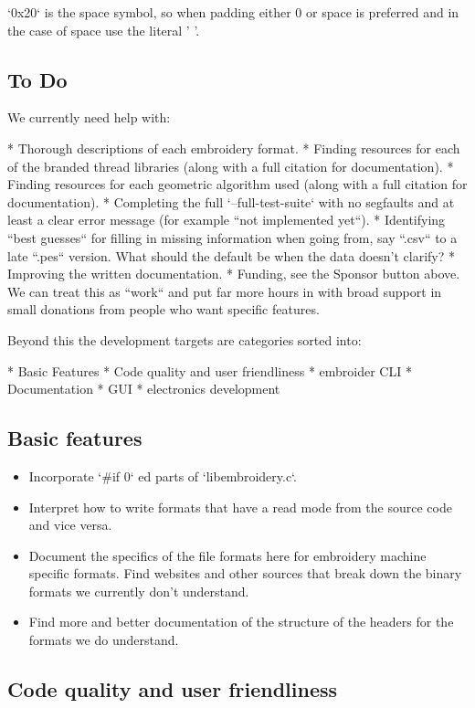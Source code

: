 \documentclass[a4paper]{report}
\begin{document}
`0x20` is the space symbol, so when padding either 0 or space is preferred and
in the case of space use the literal ' '.

\subsection{To Do}

We currently need help with:

* Thorough descriptions of each embroidery format.
* Finding resources for each of the branded thread libraries (along with a
  full citation for documentation).
* Finding resources for each geometric algorithm used (along with a full
  citation for documentation).
* Completing the full `--full-test-suite` with no segfaults and at least a
  clear error message (for example ``not implemented yet``).
* Identifying ``best guesses`` for filling in missing information when going
  from, say ``.csv`` to a late ``.pes`` version. What should the default be when
  the data doesn't clarify?
* Improving the written documentation.
* Funding, see the Sponsor button above. We can treat this as ``work`` and
  put far more hours in with broad support in small donations from people who want
  specific features.

Beyond this the development targets are categories sorted into:

* Basic Features
* Code quality and user friendliness
* embroider CLI
* Documentation
* GUI
* electronics development

\subsection{Basic features}

\begin{itemize}
\item Incorporate `\#if 0` ed parts of `libembroidery.c`.
\item Interpret how to write formats that have a read mode from the source
code and vice versa.
\item Document the specifics of the file formats here for embroidery machine
specific formats. Find websites and other sources that break down the binary
formats we currently don't understand.
\item Find more and better documentation of the structure of the headers for the
formats we do understand.
\end{itemize}

\subsection{Code quality and user friendliness}
\end{document}
